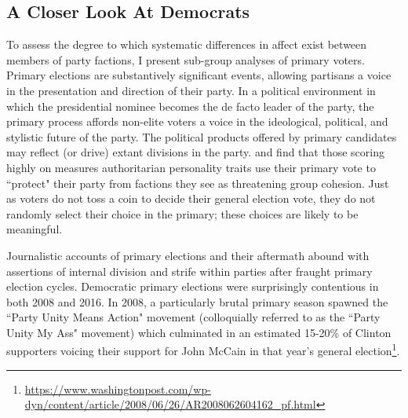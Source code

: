 \documentclass[12pt]{article}
\begin{document}

%
\subsection{A Closer Look At Democrats}

To assess the degree to which systematic differences in affect exist between members of party factions, I present sub-group analyses of primary voters. Primary elections are substantively significant events, allowing partisans a voice in the presentation and direction of their party. In a political environment in which the presidential nominee becomes the de facto leader of the party, the primary process affords non-elite voters a voice in the ideological, political, and stylistic future of the party. The political products offered by primary candidates may reflect (or drive) extant divisions in the party. \cite{wronski2018tale} and \cite{bankert2020authoritarian} find that those scoring highly on measures authoritarian personality traits use their primary vote to ``protect" their party from factions they see as threatening group cohesion. Just as voters do not toss a coin to decide their general election vote, they do not randomly select their choice in the primary; these choices are likely to be meaningful. 

Journalistic accounts of primary elections and their aftermath abound with assertions of internal division and strife within parties after fraught primary election cycles. Democratic primary elections were surprisingly contentious in both 2008 and 2016. In 2008, a particularly brutal primary season spawned the ``Party Unity Means Action" movement (colloquially referred to as the ``Party Unity My Ass" movement) which culminated in an estimated 15-20\% of Clinton supporters voicing their support for John McCain in that year's general election\footnote{\url{https://www.washingtonpost.com/wp-dyn/content/article/2008/06/26/AR2008062604162_pf.html}}.
\end{document}
